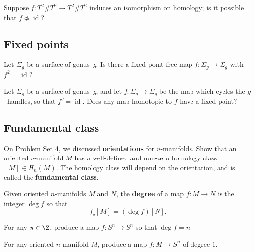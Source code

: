 \documentclass[12pt]{pset}
\DeclareMathOperator{\id}{id}
\begin{document}
\begin{problem}
  Suppose $f : T^2 \# T^2 \to T^2 \# T^2$ induces an isomorphism on homology; is it possible that $f \not\simeq \id$?
\end{problem}

\subsection*{Fixed points}

\begin{problem}
  Let $\Sigma_g$ be a surface of genus~$g$.  Is there a fixed point free map $f : \Sigma_g \to \Sigma_g$ with $f^2 = \id$?
\end{problem}

\begin{requiredproblem}
  Let $\Sigma_g$ be a surface of genus~$g$, and let $f : \Sigma_g \to \Sigma_g$ be the map which cycles the $g$~handles, so that $f^g = \id$.  Does any map  homotopic to $f$ have a fixed point?
\end{requiredproblem}

\pagebreak
\subsection*{Fundamental class}

\begin{requiredproblem}
  On Problem Set 4, we discussed \textbf{orientations} for
  $n$-manifolds.  Show that an oriented $n$-manifold $M$ has a
  well-defined and non-zero homology class $[M] \in H_n(M)$.  The homology
  class will depend on the orientation, and is called the \textbf{fundamental class}.
\end{requiredproblem}

\begin{definition*}
  Given oriented $n$-manifolds $M$ and $N$, the \textbf{degree} of a map $f : M \to N$ is the integer $\deg f$ so that
  $$
  f_\star [M] = (\deg f) [N].
  $$
\end{definition*}

\begin{problem}
  For any $n \in \Z$, produce a map $f : S^n \to S^n$ so that $\deg f = n$.
\end{problem}

\begin{problem}
  For any oriented $n$-manifold $M$, produce a map $f : M \to S^n$ of degree $1$.
\end{problem}
\end{document}

